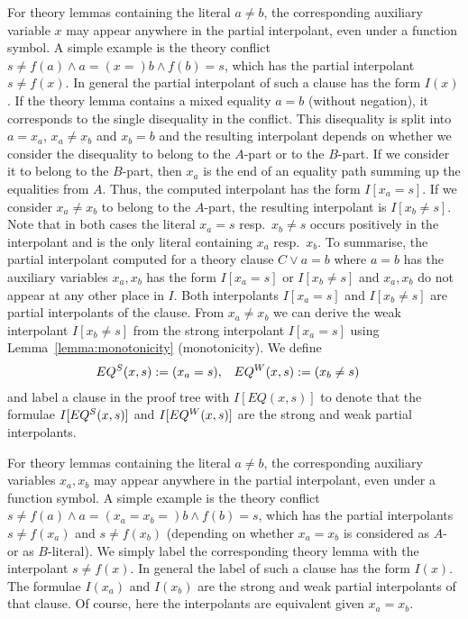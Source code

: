 For theory lemmas containing the literal $a\neq b$, the corresponding
auxiliary variable $x$ may appear anywhere in the partial
interpolant, even under a function symbol.  A simple example is the
theory conflict $s\neq f(a) \land a=(x =)b \land f(b)=s$,
which has the partial interpolant $s\neq f(x)$.  In general the 
partial interpolant of such a clause has the form $I(x)$.
\else
If the theory lemma contains a mixed equality $a=b$ (without negation),
it corresponds to the single
disequality in the conflict.  
This disequality is split into $a=x_a$,
$x_a\neq x_b$ and $x_b =b$ and the resulting interpolant depends on
whether we consider the disequality to belong to the $A$-part or to
the $B$-part.  If we consider it to belong to the $B$-part, then $x_a$ is the
end of an equality path summing up the equalities from $A$.
Thus, the computed interpolant has the form $I[x_a=s]$.
If we consider $x_a\neq x_b$ to belong to the $A$-part, the
resulting interpolant is $I[x_b\neq s]$.
Note that in both cases the literal $x_a=s$ resp.\ $x_b\neq s$ occurs positively in the
interpolant and is the only literal containing $x_a$ resp.\ $x_b$.
To summarise, the partial interpolant computed for a theory clause
$C\lor a=b$ where $a=b$ has the auxiliary variables $x_a,x_b$ has the form
$I[x_a=s]$ or $I[x_b\neq s]$ and $x_a,x_b$ do not appear at any other
place in $I$.  Both interpolants $I[x_a=s]$ and $I[x_b\neq s]$ are 
partial interpolants of the clause.  From $x_a\neq x_b$ we can derive
the weak interpolant $I[x_b\neq s]$ from the strong interpolant $I[x_a=s]$
using Lemma~\ref{lemma:monotonicity} (monotonicity).
We define
\begin{align*}
  EQ\S(x,s) &:= (x_a = s), &   EQ\W(x,s) &:= (x_b\neq s)
\end{align*}
and label a clause in the proof tree with $I[EQ(x,s)]$ to denote that
the formulae $I[EQ\S(x,s)]$ and $I[EQ\W(x,s)]$ are the strong and weak
partial interpolants.

For theory lemmas containing the literal $a\neq b$, the corresponding
auxiliary variables $x_a,x_b$ may appear anywhere in the partial
interpolant, even under a function symbol.  A simple example is the
theory conflict $s\neq f(a) \land a=(x_a = x_b =)b \land f(b)=s$,
which has the partial interpolants $s\neq f(x_a)$ and $s\neq f(x_b)$
(depending on whether $x_a=x_b$ is considered as $A$- or as
$B$-literal).  We simply label the corresponding theory lemma with the
interpolant $s\neq f(x)$.  In general the label of such a clause has
the form $I(x)$.  The formulae $I(x_a)$ and $I(x_b)$ are the strong
and weak partial interpolants of that clause. Of course, here the
interpolants are equivalent given $x_a=x_b$.
\fi

